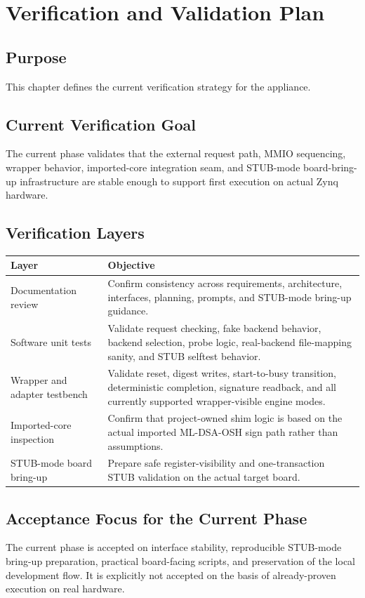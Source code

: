 \chapter{Verification and Validation Plan}

\section*{Purpose}
This chapter defines the current verification strategy for the appliance.

\section{Current Verification Goal}
The current phase validates that the external request path, MMIO sequencing, wrapper behavior, imported-core integration seam, and STUB-mode board-bring-up infrastructure are stable enough to support first execution on actual Zynq hardware.

\section{Verification Layers}
\begin{longtable}{p{} p{}}
\toprule
Layer & Objective \\
\midrule
Documentation review & Confirm consistency across requirements, architecture, interfaces, planning, prompts, and STUB-mode bring-up guidance. \\
Software unit tests & Validate request checking, fake backend behavior, backend selection, probe logic, real-backend file-mapping sanity, and STUB selftest behavior. \\
Wrapper and adapter testbench & Validate reset, digest writes, start-to-busy transition, deterministic completion, signature readback, and all currently supported wrapper-visible engine modes. \\
Imported-core inspection & Confirm that project-owned shim logic is based on the actual imported ML-DSA-OSH sign path rather than assumptions. \\
STUB-mode board bring-up & Prepare safe register-visibility and one-transaction STUB validation on the actual target board. \\
\bottomrule
\end{longtable}

\section{Acceptance Focus for the Current Phase}
The current phase is accepted on interface stability, reproducible STUB-mode bring-up preparation, practical board-facing scripts, and preservation of the local development flow. It is explicitly not accepted on the basis of already-proven execution on real hardware.

